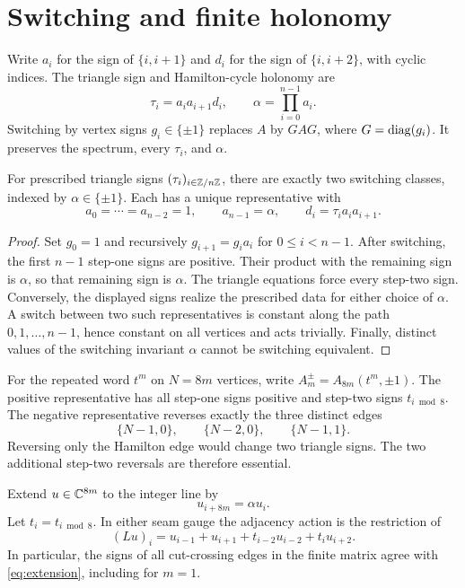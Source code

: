 \section{Switching and finite holonomy}

Write $a_i$ for the sign of $\{i,i+1\}$ and $d_i$ for the sign of
$\{i,i+2\}$, with cyclic indices. The triangle sign and Hamilton-cycle
holonomy are
\[
 \tau_i=a_i a_{i+1}d_i,\qquad \alpha=\prod_{i=0}^{n-1}a_i.
\]
Switching by vertex signs $g_i\in\{\pm1\}$ replaces $A$ by $GAG$,
where $G=\operatorname{diag}(g_i)$. It preserves the spectrum, every $\tau_i$, and
$\alpha$.

\begin{lemma}\label{lem:gauge}
For prescribed triangle signs $(\tau_i)_{i\in\mathbb Z/n\mathbb Z}$, there are exactly
two switching classes, indexed by $\alpha\in\{\pm1\}$. Each has a unique
representative with
\[
 a_0=\cdots=a_{n-2}=1,\qquad a_{n-1}=\alpha,
 \qquad d_i=\tau_i a_i a_{i+1}.
\]
\end{lemma}
\begin{proof}
Set $g_0=1$ and recursively $g_{i+1}=g_i a_i$ for $0\le i<n-1$.
After switching, the first $n-1$ step-one signs are positive. Their product
with the remaining sign is $\alpha$, so that remaining sign is $\alpha$.
The triangle equations force every step-two sign. Conversely, the displayed
signs realize the prescribed data for either choice of $\alpha$.
A switch between two such representatives is constant along the path
$0,1,\ldots,n-1$, hence constant on all vertices and acts trivially.
Finally, distinct values of the switching invariant $\alpha$ cannot be
switching equivalent.
\end{proof}

For the repeated word $t^m$ on $N=8m$ vertices, write
$A_m^\pm=A_{8m}(t^m,\pm1)$. The positive representative has all step-one
signs positive and step-two signs $t_{i\bmod8}$. The negative representative
reverses exactly the three distinct edges
\begin{equation}
 \{N-1,0\},\qquad\{N-2,0\},\qquad\{N-1,1\}.
 \label{eq:seam}
\end{equation} Reversing only the Hamilton edge would
change two triangle signs. The two additional step-two reversals are
therefore essential.

Extend $u\in\mathbb C^{8m}$ to the integer line by
\begin{equation}
 u_{i+8m}=\alpha u_i.
 \label{eq:extension}
\end{equation}
Let $t_i=t_{i\bmod8}$. In either seam gauge the adjacency action is the
restriction of
\begin{equation}
 (Lu)_i=u_{i-1}+u_{i+1}+t_{i-2}u_{i-2}+t_i u_{i+2}.
 \label{eq:infinite-action}
\end{equation}
In particular, the signs of all cut-crossing edges in the finite matrix
agree with \eqref{eq:extension}, including for $m=1$.

